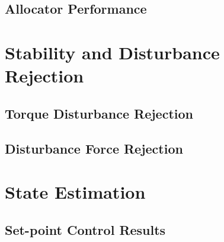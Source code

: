 \subsection{Allocator Performance}
\label{subsec:simulation.comparison.allocator}
\section{Stability and Disturbance Rejection}
\label{sec:simulation.disturbnace}
\subsection{Torque Disturbance Rejection}
\label{sec:simulation.disturbance.torque}
\subsection{Disturbance Force Rejection}
\label{sec:simulation.disturbance.force}
\section{State Estimation}
\label{sec:simulation.state}
\subsection{Set-point Control Results}
\label{sec:simulation.autopilot}
